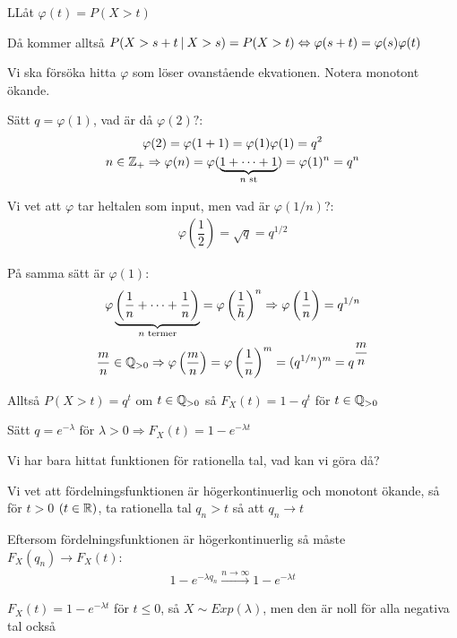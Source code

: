 \begin{prf}
  LLåt $\varphi(t) = P(X>t)$\par
  \noindent Då kommer alltså $P(X>s+t\:|\:X>s) = P(X>t)\Leftrightarrow \varphi(s+t) = \varphi(s)\varphi(t)$
  \par\bigskip
  \noindent Vi ska försöka hitta $\varphi$ som löser ovanstående ekvationen. Notera monotont ökande.
  \par\bigskip
  \noindent Sätt $q = \varphi(1)$, vad är då $\varphi(2)?$:
  \begin{equation*}
    \begin{gathered}
      \varphi(2) = \varphi(1+1) = \varphi(1)\varphi(1) = q^2\\
      n\in\mathbb{Z}_+\Rightarrow \varphi(n) = \varphi(\underbrace{1+\cdots+1}_{\text{$n$ st}}) = \varphi(1)^n = q^n
    \end{gathered}
  \end{equation*}\par
  \noindent Vi vet att $\varphi$ tar heltalen som input, men vad är $\varphi(1/n)$?:
  \begin{equation*}
    \begin{gathered}
      \varphi\left(\dfrac{1}{2}\right) = \sqrt{q} = q^{1/2}
    \end{gathered}
  \end{equation*}\par
  \noindent På samma sätt är $\varphi(1)$:
  \begin{equation*}
    \begin{gathered}
      \varphi\underbrace{\left(\dfrac{1}{n}+\cdots+\dfrac{1}{n}\right)}_{\text{$n$ termer}} = \varphi\left(\dfrac{1}{h}\right)^n \Rightarrow \varphi\left(\dfrac{1}{n}\right) = q^{1/n}\\
      \dfrac{m}{n}\in\mathbb{Q}_{>0}\Rightarrow \varphi\left(\dfrac{m}{n}\right) = \varphi\left(\dfrac{1}{n}\right)^m = (q^{1/n})^m = q^{\dfrac{m}{n}}
    \end{gathered}
  \end{equation*}
  \par\bigskip
  \noindent Alltså $P(X>t) = q^t$ om $t\in\mathbb{Q}_{>0}$ så $F_X(t) = 1-q^t$ för $t\in\mathbb{Q}_{>0}$
  \par\bigskip
  \noindent Sätt $q = e^{-\lambda}$ för $\lambda>0\Rightarrow F_X(t) = 1-e^{-\lambda t}$
  \par\bigskip
  \noindent Vi har bara hittat funktionen för rationella tal, vad kan vi göra då?\par
  \noindent Vi vet att fördelningsfunktionen är högerkontinuerlig och monotont ökande, så för $t>0$ $(t\in\mathbb{R})$, ta rationella tal $q_n>t$ så att $q_n\to t$\par
  \noindent Eftersom fördelningsfunktionen är högerkontinuerlig så måste $F_X(q_n)\to F_X(t)$:
  \begin{equation*}
    \begin{gathered}
      1-e^{-\lambda q_n}\stackrel{n\to\infty}{\to}1-e^{-\lambda t}
    \end{gathered}
  \end{equation*}
  \par\bigskip
  \noindent $F_X(t) = 1-e^{-\lambda t}$ för $t\leq0$, så $X\sim Exp(\lambda)$, men den är noll för alla negativa tal också 
\end{prf}
